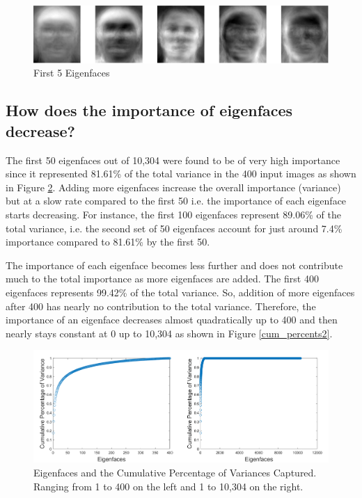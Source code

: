 \documentclass[letterpaper,12pt]{article}
\begin{document}

\begin{figure}[htp]
    \centering
    \includegraphics[width=15cm]{5faces}
    \caption{First 5 Eigenfaces}
    \label{5faces}
\end{figure}


\subsection{How does the importance of eigenfaces decrease?}\label{Q1.2}

The first 50 eigenfaces out of 10,304 were found to be of very high importance since it represented 81.61\% of the total variance in the 400 input images as shown in Figure \ref{cum_percents}. Adding more eigenfaces increase the overall importance (variance) but at a slow rate compared to the first 50 i.e. the importance of each eigenface starts decreasing. For instance, the first 100 eigenfaces represent 89.06\% of the total variance, i.e. the second set of 50 eigenfaces account for just around 7.4\% importance compared to 81.61\% by the first 50. 

The importance of each eigenface becomes less further and does not contribute much to the total importance as more eigenfaces are added. The first 400 eigenfaces represents 99.42\% of the total variance. So, addition of more eigenfaces after 400 has nearly no contribution to the total variance. Therefore, the importance of an eigenface decreases almost quadratically up to 400 and then nearly stays constant at 0 up to 10,304 as shown in Figure \ref{cum_percents2}.


\begin{figure}[htp]
    \centering
    \includegraphics[width=14cm]{cum_percents.png}
    \caption{Eigenfaces and the Cumulative Percentage of Variances Captured. Ranging from 1 to 400 on the left and 1 to 10,304 on the right.}
    \label{cum_percents}
\end{figure}
\end{document}
